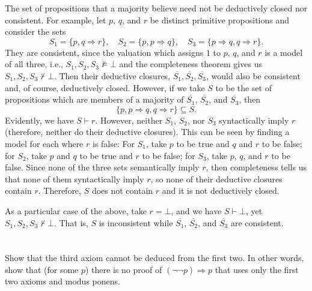 \documentclass[12pt]{article}
\newenvironment{problem}
    {\begin{lrbox}{\mybox}\begin{minipage}{0.98\textwidth}}
    {\end{minipage}\end{lrbox}\begin{center}\framebox[\textwidth]{\usebox{\mybox}}\end{center}}
\renewcommand{\implies}{\Rightarrow}
\renewcommand{\models}{\vDash}
\newcommand{\proves}{\vdash}
\newcommand{\clo}{\overline}
\begin{document}
The set of propositions that a majority believe need not be deductively closed nor consistent. For example, let $p$, $q$, and $r$ be distinct primitive propositions and consider the sets
\[
    S_1 = \{p, q \implies r\}, \quad S_2 = \{p, p \implies q\}, \quad S_3 = \{p \implies q, q \implies r\}.
\]
They are consistent, since the valuation which assigns $1$ to $p$, $q$, and $r$ is a model of all three, i.e., $S_1, S_2, S_3 \not\models \bot$ and the completeness theorem gives us $S_1, S_2, S_3 \not\proves \bot$. Then their deductive closures, $\clo{S_1}, \clo{S_2}, \clo{S_3}$, would also be consistent and, of course, deductively closed. However, if we take $S$ to be the set of propositions which are members of a majority of $\clo{S_1}$, $\clo{S_2}$, and $\clo{S_3}$, then
\[
    \{p, p \implies q, q \implies r\} \subseteq S.
\]
Evidently, we have $S \proves r$. However, neither $S_1$, $S_2$, nor $S_3$ syntactically imply $r$ (therefore, neither do their deductive closures). This can be seen by finding a model for each where $r$ is false: For $S_1$, take $p$ to be true  and $q$ and $r$ to be false; for $S_2$, take $p$ and $q$ to be true and $r$ to be false; for $S_3$, take $p$, $q$, and $r$ to be false. Since none of the three sets semantically imply $r$, then completeness tells us that none of them syntactically imply $r$, so none of their deductive closures contain $r$. Therefore, $S$ does not contain $r$ and it is not deductively closed.

As a particular case of the above, take $r = \bot$, and we have $S \proves \bot$, yet $S_1, S_2, S_3 \not\proves \bot$. That is, $S$ is inconsistent while $\clo{S_1}$, $\clo{S_2}$, and $\clo{S_3}$ are consistent.

\newpage
\section{}
\begin{problem}
     Show that the third axiom cannot be deduced from the first two. In other words, show that (for some $p$) there is no proof of $(\lnot \lnot p) \implies p$ that uses only the first two axioms and modus ponens.
\end{problem}
\end{document}
